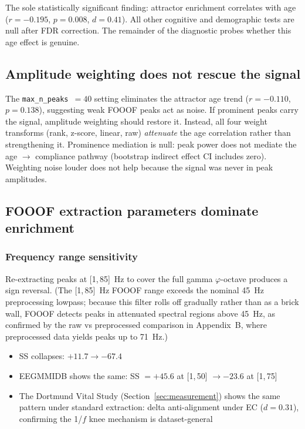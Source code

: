 \documentclass[11pt,a4paper]{article}
\newcommand{\phisym}{\varphi}
\begin{document}
\begin{keyinsight}
The sole statistically significant finding: attractor enrichment correlates with age ($r = -0.195$, $p = 0.008$, $d = 0.41$). All other cognitive and demographic tests are null after FDR correction. The remainder of the diagnostic probes whether this age effect is genuine.
\end{keyinsight}

\subsection{Amplitude weighting does not rescue the signal}

The \texttt{max\_n\_peaks}~$= 40$ setting eliminates the attractor age trend ($r = -0.110$, $p = 0.138$), suggesting weak FOOOF peaks act as noise. If prominent peaks carry the signal, amplitude weighting should restore it. Instead, all four weight transforms (rank, z-score, linear, raw) \textit{attenuate} the age correlation rather than strengthening it. Prominence mediation is null: peak power does not mediate the age $\to$ compliance pathway (bootstrap indirect effect CI includes zero). Weighting noise louder does not help because the signal was never in peak amplitudes.

\subsection{FOOOF extraction parameters dominate enrichment}
\label{sec:diagnostic_cascade}

\subsubsection{Frequency range sensitivity}
\label{sec:freq_range}

Re-extracting peaks at [1,\,85]~Hz to cover the full gamma $\phisym$-octave produces a sign reversal. (The [1,\,85]~Hz FOOOF range exceeds the nominal 45~Hz preprocessing lowpass; because this filter rolls off gradually rather than as a brick wall, FOOOF detects peaks in attenuated spectral regions above 45~Hz, as confirmed by the raw vs preprocessed comparison in Appendix~B, where preprocessed data yields peaks up to 71~Hz.)
\begin{itemize}
    \item SS collapses: $+11.7 \to -67.4$
    \item EEGMMIDB shows the same: SS $= +45.6$ at [1,\,50] $\to -23.6$ at [1,\,75]
    \item The Dortmund Vital Study (Section~\ref{sec:measurement}) shows the same pattern under standard extraction: delta anti-alignment under EC ($d = 0.31$), confirming the 1/$f$ knee mechanism is dataset-general
\end{itemize}
\end{document}
